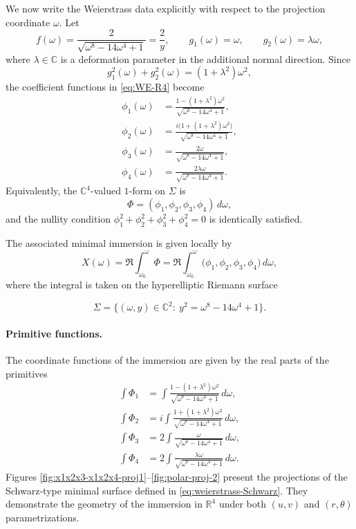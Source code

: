 \documentclass[12pt]{article}
\numberwithin{equation}{section}
\theoremstyle{definition}
\theoremstyle{remark}
\begin{document}
We now write the Weierstrass data explicitly with respect to the projection coordinate $\omega$.
Let
\[
f(\omega)=\frac{2}{\sqrt{\omega^8-14\omega^4+1}}=\frac{2}{y}, \qquad
g_1(\omega)=\omega, \qquad
g_2(\omega)=\lambda\omega,
\]
where $\lambda\in\mathbb{C}$ is a deformation parameter in the additional normal direction.
Since
\[
g_1^2(\omega)+g_2^2(\omega)=(1+\lambda^2)\omega^2,
\]
the coefficient functions in \eqref{eq:WE-R4} become
\[
\begin{aligned}
\phi_1(\omega)
&=
\frac{1-(1+\lambda^2)\omega^2}
{\sqrt{\omega^8-14\omega^4+1}},
\\[2mm]
\phi_2(\omega)
&=
\frac{i\bigl(1+(1+\lambda^2)\omega^2\bigr)}
{\sqrt{\omega^8-14\omega^4+1}},
\\[2mm]
\phi_3(\omega)
&=
\frac{2\omega}
{\sqrt{\omega^8-14\omega^4+1}},
\\[2mm]
\phi_4(\omega)
&=
\frac{2\lambda\omega}
{\sqrt{\omega^8-14\omega^4+1}}.
\end{aligned}
\]
Equivalently, the $\mathbb{C}^4$-valued $1$-form on $\Sigma$ is
\[
\Phi=(\phi_1,\phi_2,\phi_3,\phi_4)\,d\omega,
\]
and the nullity condition $\phi_1^2+\phi_2^2+\phi_3^2+\phi_4^2=0$ is identically satisfied.

\medskip

The associated minimal immersion is given locally by
\[
X(\omega)
=
\Re\int_{\omega_0}^{\omega}
\Phi
=
\Re\int_{\omega_0}^{\omega}
\bigl(\phi_1,\phi_2,\phi_3,\phi_4\bigr)\,d\omega,
\]
where the integral is taken on the hyperelliptic Riemann surface



\[
\Sigma
=
\bigl\{(\omega,y)\in\mathbb{C}^2:\ y^2=\omega^8-14\omega^4+1\bigr\}.
\]




\paragraph{Primitive functions.}
The coordinate functions of the immersion are given by the real parts of the primitives
\begin{equation}
\begin{aligned}
\int \Phi_1
&=
\int
\frac{1-(1+\lambda^2)\omega^2}
{\sqrt{\omega^8-14\omega^4+1}}
\,d\omega,
\\[2mm]
\int \Phi_2
&=
i\int
\frac{1+(1+\lambda^2)\omega^2}
{\sqrt{\omega^8-14\omega^4+1}}
\,d\omega,
\\[2mm]
\int \Phi_3
&=
2\int
\frac{\omega}
{\sqrt{\omega^8-14\omega^4+1}}
\,d\omega,
\\[2mm]
\int \Phi_4
&=
2\int
\frac{\lambda\omega}
{\sqrt{\omega^8-14\omega^4+1}}
\,d\omega.
\end{aligned}
\label{eq:weierstrass-Schwarz}
\end{equation}
Figures \ref{fig:x1x2x3-x1x2x4-proj1}--\ref{fig:polar-proj-2} present the projections of the Schwarz-type minimal surface defined in \eqref{eq:weierstrass-Schwarz}. 
They demonstrate the geometry of the immersion in $\mathbb{R}^4$ under both $(u,v)$ and $(r,\theta)$ parametrizations.
\end{document}
